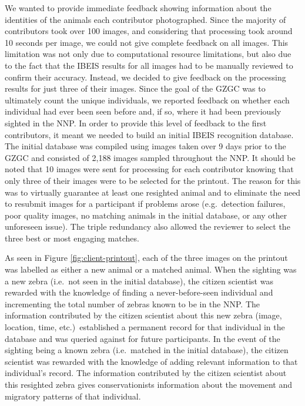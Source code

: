 We wanted to provide immediate feedback showing information about the identities of the animals each contributor photographed.  Since the majority of contributors took over 100 images, and considering that processing took around 10 seconds per image, we could not give complete feedback on all images.  This limitation was not only due to computational resource limitations, but also due to the fact that the IBEIS results for all images had to be manually reviewed to confirm their accuracy.  Instead, we decided to give feedback on the processing results for just three of their images.  Since the goal of the GZGC was to ultimately count the unique individuals, we reported feedback on whether each individual had ever been seen before and, if so, where it had been previously sighted in the NNP.  In order to provide this level of feedback to the first contributors, it meant we needed to build an initial IBEIS recognition database.  The initial database was compiled using images taken over 9 days prior to the GZGC and consisted of 2,188 images sampled throughout the NNP.
It should be noted that 10 images were sent for processing for each contributor knowing that only three of their images were to be selected for the printout.  The reason for this was to virtually guarantee at least one resighted animal and to eliminate the need to resubmit images for a participant if problems arose (e.g.\ detection failures, poor quality images, no matching animals in the initial database, or any other unforeseen issue).  The triple redundancy also allowed the reviewer to select the three best or most engaging matches.

As seen in Figure \ref{fig:client-printout}, each of the three images on the printout was labelled as either a new animal or a matched animal.  When the sighting was a new zebra (i.e.\ not seen in the initial database), the citizen scientist was rewarded with the knowledge of finding a never-before-seen individual and incrementing the total number of zebras known to be in the NNP.  The information contributed by the citizen scientist about this new zebra (image, location, time, etc.)\ established a permanent record for that individual in the database and was queried against for future participants.  In the event of the sighting being a known zebra (i.e.\ matched in the initial database), the citizen scientist was rewarded with the knowledge of adding relevant information to that individual's record.  The information contributed by the citizen scientist about this resighted zebra gives conservationists information about the movement and migratory patterns of that individual.

